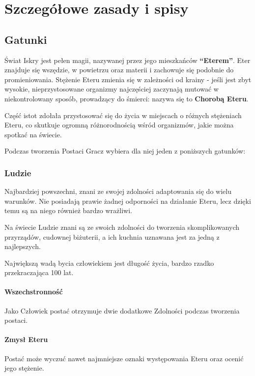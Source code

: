 \documentclass[10pt,a4paper]{book}
\begin{document}
\chapter{Szczegółowe zasady i spisy}


\section{Gatunki}
\begin{multicols}{2}

Świat Iskry jest pełen magii, nazywanej przez jego mieszkańców \textbf{“Eterem”}. Eter znajduje się wszędzie, w powietrzu oraz materii i zachowuje się podobnie do promieniowania. Stężenie Eteru zmienia się w zależności od krainy - jeśli jest zbyt wysokie, nieprzystosowane organizmy najczęściej zaczynają mutować w niekontrolowany sposób, prowadzący do śmierci: nazywa się to \textbf{Chorobą Eteru}.

Część istot zdołała przystosować się do życia w miejscach o różnych stężeniach Eteru, co skutkuje ogromną różnorodnością wśród organizmów, jakie można spotkać na świecie.

Podczas tworzenia Postaci Gracz wybiera dla niej jeden z poniższych gatunków:


\subsection*{Ludzie}
Najbardziej powszechni, znani ze swojej zdolności adaptowania się do wielu warunków. Nie posiadają prawie żadnej odporności na działanie Eteru, lecz dzięki temu są na niego również bardzo wrażliwi.

Na świecie Ludzie znani są ze swoich zdolności do tworzenia skomplikowanych przyrządów, cudownej biżuterii, a ich kuchnia uznawana jest za jedną z najlepszych.

Największą wadą bycia człowiekiem jest długość życia, bardzo rzadko przekraczająca 100 lat.

\subsubsection*{Wszechstronność}
Jako Człowiek postać otrzymuje dwie dodatkowe Zdolności podczas tworzenia postaci.

\subsubsection*{Zmysł Eteru}Postać może wyczuć nawet najmniejsze oznaki występowania Eteru oraz ocenić jego stężenie. 





\end{multicols}
\end{document}
